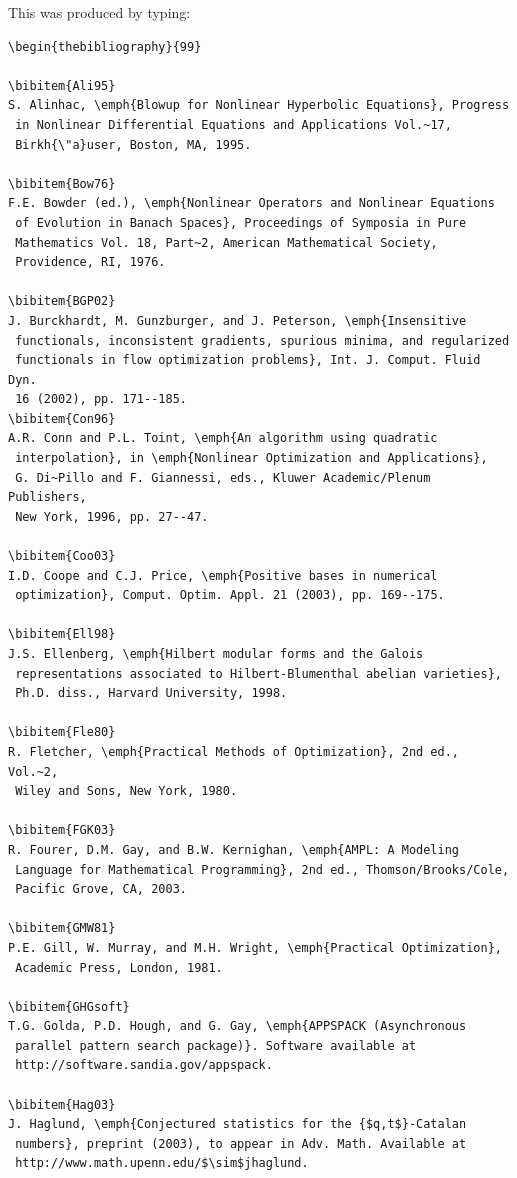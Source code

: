 \documentclass[]{interact}
\theoremstyle{plain}%
\theoremstyle{definition}
\theoremstyle{remark}
\begin{document}
\bigskip
\noindent This was produced by typing:
\medskip
\begin{verbatim}
\begin{thebibliography}{99}

\bibitem{Ali95}
S. Alinhac, \emph{Blowup for Nonlinear Hyperbolic Equations}, Progress 
 in Nonlinear Differential Equations and Applications Vol.~17, 
 Birkh{\"a}user, Boston, MA, 1995.

\bibitem{Bow76}
F.E. Bowder (ed.), \emph{Nonlinear Operators and Nonlinear Equations 
 of Evolution in Banach Spaces}, Proceedings of Symposia in Pure 
 Mathematics Vol. 18, Part~2, American Mathematical Society, 
 Providence, RI, 1976.

\bibitem{BGP02}
J. Burckhardt, M. Gunzburger, and J. Peterson, \emph{Insensitive 
 functionals, inconsistent gradients, spurious minima, and regularized 
 functionals in flow optimization problems}, Int. J. Comput. Fluid Dyn. 
 16 (2002), pp. 171--185.
\bibitem{Con96}
A.R. Conn and P.L. Toint, \emph{An algorithm using quadratic 
 interpolation}, in \emph{Nonlinear Optimization and Applications}, 
 G. Di~Pillo and F. Giannessi, eds., Kluwer Academic/Plenum Publishers, 
 New York, 1996, pp. 27--47.

\bibitem{Coo03}
I.D. Coope and C.J. Price, \emph{Positive bases in numerical 
 optimization}, Comput. Optim. Appl. 21 (2003), pp. 169--175.

\bibitem{Ell98}
J.S. Ellenberg, \emph{Hilbert modular forms and the Galois 
 representations associated to Hilbert-Blumenthal abelian varieties}, 
 Ph.D. diss., Harvard University, 1998.

\bibitem{Fle80}
R. Fletcher, \emph{Practical Methods of Optimization}, 2nd ed., Vol.~2, 
 Wiley and Sons, New York, 1980.

\bibitem{FGK03}
R. Fourer, D.M. Gay, and B.W. Kernighan, \emph{AMPL: A Modeling 
 Language for Mathematical Programming}, 2nd ed., Thomson/Brooks/Cole, 
 Pacific Grove, CA, 2003.

\bibitem{GMW81}
P.E. Gill, W. Murray, and M.H. Wright, \emph{Practical Optimization}, 
 Academic Press, London, 1981.

\bibitem{GHGsoft}
T.G. Golda, P.D. Hough, and G. Gay, \emph{APPSPACK (Asynchronous 
 parallel pattern search package)}. Software available at 
 http://software.sandia.gov/appspack.

\bibitem{Hag03}
J. Haglund, \emph{Conjectured statistics for the {$q,t$}-Catalan 
 numbers}, preprint (2003), to appear in Adv. Math. Available at 
 http://www.math.upenn.edu/$\sim$jhaglund.


\end{verbatim}
\end{document}
